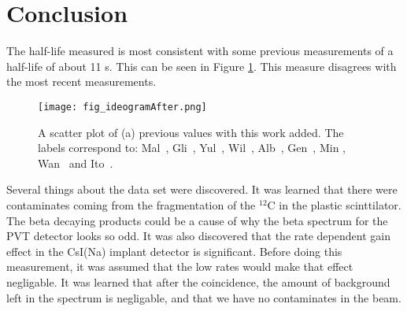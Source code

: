 \section{Conclusion}
\label{sec:conclusion}

The half-life measured is most consistent with some previous measurements of a half-life of about 11 s. 
This can be seen in Figure \ref{fig:ideogramfinal}.
This measure disagrees with the most recent measurements.

\begin{figure}[!htb]
\centerline{\texttt{[image: fig\_ideogramAfter.png]}}
\caption{A scatter plot of (a) previous values with this work added.
	 The labels correspond to: Mal~\cite{Mal62}, Gli~\cite{Gli63},
	Yul~\cite{Yul67}, Wil~\cite{Wil70}, Alb~\cite{Alb75}, Gen~\cite{Gen76},
	Min \cite{Min87}, Wan~\cite{Wan92} and Ito~\cite{Ito95}.}
\label{fig:ideogramfinal}
\end{figure}

Several things about the data set were discovered.
It was learned that there were contaminates coming from the fragmentation of the $^{12}$C in the plastic scinttilator.
The beta decaying products could be a cause of why the beta spectrum for the PVT detector looks so odd.
It was also discovered that the rate dependent gain effect in the CsI(Na) implant detector is significant.
Before doing this measurement, it was assumed that the low rates would make that effect negligable.
It was learned that after the coincidence, the amount of background left in the spectrum is negligable, and that we have no contaminates in the beam.



